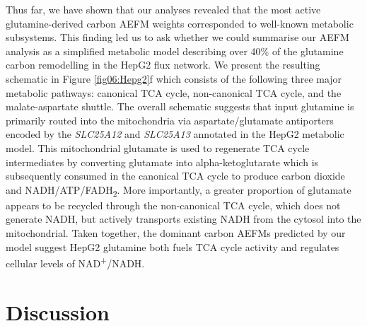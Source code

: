 \documentclass[12pt]{article}
\begin{document}
Thus far, we have shown that our analyses revealed that the most active
glutamine-derived carbon AEFM weights corresponded to well-known metabolic
subsystems. This finding led us to ask whether we could summarise our AEFM
analysis as a simplified metabolic model describing over 40\% of the
glutamine carbon remodelling in the HepG2 flux network. We present the
resulting schematic in Figure \ref{fig06:Hepg2}f which consists
of the following three major metabolic pathways: canonical TCA cycle,
non-canonical TCA cycle, and the malate-aspartate shuttle. The overall
schematic suggests that input glutamine is primarily routed into the
mitochondria via aspartate/glutamate antiporters encoded by the
\textit{SLC25A12} and \textit{SLC25A13} annotated in the HepG2 metabolic
model. This mitochondrial glutamate is used to regenerate TCA cycle
intermediates by converting glutamate into alpha-ketoglutarate which is
subsequently consumed in the canonical TCA cycle to produce carbon dioxide
and NADH/ATP/FADH\textsubscript{2}. More importantly, a greater proportion
of glutamate appears to be recycled through the non-canonical TCA cycle,
which does not generate NADH, but actively transports existing NADH from
the cytosol into the mitochondrial. Taken together, the dominant carbon
AEFMs predicted by our model suggest HepG2 glutamine both fuels TCA cycle
activity and regulates cellular levels of NAD\textsuperscript{+}/NADH.

\section*{Discussion}





\end{document}
